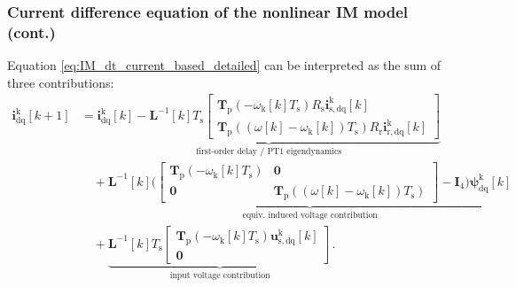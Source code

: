 \begin{frame}
    \frametitle{Current difference equation of the nonlinear IM model (cont.)}
    Equation \eqref{eq:IM_dt_current_based_detailed} can be interpreted as the sum of three contributions:
    \begin{equation}
        \begin{split}
            \bm{i}^{\mathrm{k}}_\mathrm{dq}[k+1]
             & =
            \underbrace{\bm{i}^{\mathrm{k}}_\mathrm{dq}[k]-\bm{L}^{-1}[k]T_\mathrm{s}
                \begin{bmatrix}
                    \bm{T}_\mathrm{p}(-\omega_\mathrm{k}[k]T_\mathrm{s})R_\mathrm{s}\bm{i}^{\mathrm{k}}_{\mathrm{s,dq}}[k] \\
                    \bm{T}_\mathrm{p}((\omega[k]-\omega_\mathrm{k}[k])T_\mathrm{s})R_\mathrm{r}\bm{i}^{\mathrm{k}}_{\mathrm{r,dq}}[k]
                \end{bmatrix}}_{\text{first-order delay / PT1 eigendynamics}}                    \\
             & \quad+\underbrace{\bm{L}^{-1}[k]\Bigg(\!\left[
                             \begin{array}{cc}
                                 \bm{T}_\mathrm{p}(-\omega_\mathrm{k}[k]T_\mathrm{s}) & \bm{0}                                                          \\
                                 \bm{0}                                               & \bm{T}_\mathrm{p}((\omega[k]-\omega_\mathrm{k}[k])T_\mathrm{s})
                             \end{array}\right]-\bm{I}_4\!\Bigg)\bm{\psi}^{\mathrm{k}}_\mathrm{dq}[k]}_{\text{equiv. induced voltage contribution}} \\
             & \quad+\underbrace{\bm{L}^{-1}[k]T_\mathrm{s}
                         \begin{bmatrix}
                             \bm{T}_\mathrm{p}(-\omega_\mathrm{k}[k]T_\mathrm{s})\bm{u}^{\mathrm{k}}_{\mathrm{s,dq}}[k] \\
                             \bm{0}
                         \end{bmatrix}}_{\text{input voltage contribution}} .
        \end{split}
        \label{eq:IM_dt_current_based_interpretation}
    \end{equation}
\end{frame}

